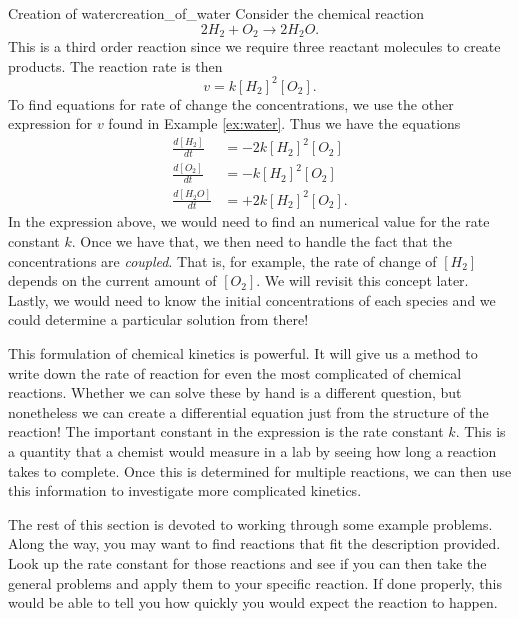         \begin{ex}{Creation of water}{creation_of_water}
            Consider the chemical reaction
            \[
                2H_2 + O_2 \to 2H_2 O.
            \]
            This is a third order reaction since we require three reactant molecules to create products. The reaction rate is then
            \[
                v=k[H_2]^2 [O_2].
            \]
            To find equations for rate of change the concentrations, we use the other expression for $v$ found in Example \ref{ex:water}. Thus we have the equations
            \begin{align*}
                \frac{d[H_2]}{dt} &= -2 k [H_2]^2 [O_2]\\
                \frac{d[O_2]}{dt} &= -k[H_2]^2[O_2]\\
                \frac{d[H_2O]}{dt} &= +2k [H_2]^2[O_2].
            \end{align*}
            In the expression above, we would need to find an numerical value for the rate constant $k$. Once we have that, we then need to handle the fact that the concentrations are \emph{coupled}. That is, for example, the rate of change of $[H_2]$ depends on the current amount of $[O_2]$.  We will revisit this concept later. Lastly, we would need to know the initial concentrations of each species and we could determine a particular solution from there!
        \end{ex}

        This formulation of chemical kinetics is powerful.  It will give us a method to write down the rate of reaction for even the most complicated of chemical reactions.  Whether we can solve these by hand is a different question, but nonetheless we can create a differential equation just from the structure of the reaction! The important constant in the expression is the rate constant $k$.  This is a quantity that a chemist would measure in a lab by seeing how long a reaction takes to complete.  Once this is determined for multiple reactions, we can then use this information to investigate more complicated kinetics.

        The rest of this section is devoted to working through some example problems.  Along the way, you may want to find reactions that fit the description provided.  Look up the rate constant for those reactions and see if you can then take the general problems and apply them to your specific reaction. If done properly, this would be able to tell you how quickly you would expect the reaction to happen.

